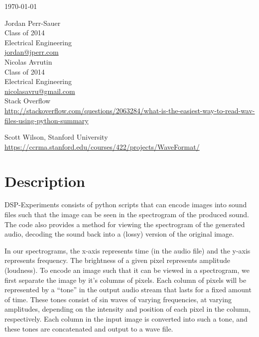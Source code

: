 \documentclass[12pt,letterpaper]{article}
\begin{document}
\noindent
\today
\vspace{1cm}

\noindent
Jordan Perr-Sauer\\
Class of 2014\\
Electrical Engineering\\
\url{jordan@jperr.com}\\

\noindent
Nicolas Avrutin\\
Class of 2014\\
Electrical Engineering\\
\url{nicolasavru@gmail.com}\\

\noindent
Stack Overflow\\
\url{http://stackoverflow.com/questions/2063284/what-is-the-easiest-way-to-read-wav-files-using-python-summary}

\noindent
Scott Wilson, Stanford University\\
\url{https://ccrma.stanford.edu/courses/422/projects/WaveFormat/}



\section{Description}

DSP-Experiments consists of python scripts that can encode images into sound files such that the image can be seen in the spectrogram of the produced sound. The code also provides a method for viewing the spectrogram of the generated audio, decoding the sound back into a (lossy) version of the original image.

In our spectrograms, the x-axis represents time (in the audio file) and the y-axis represents frequency. The brightness of a given pixel represents amplitude (loudness). To encode an image such that it can be viewed in a spectrogram, we first separate the image by it's columns of pixels. Each column of pixels will be represented by a ``tone'' in the output audio stream that lasts for a fixed amount of time. These tones consist of sin waves of varying frequencies, at varying amplitudes, depending on the intensity and position of each pixel in the column, respectively. Each column in the input image is converted into such a tone, and these tones are concatenated and output to a wave file.
\end{document}
